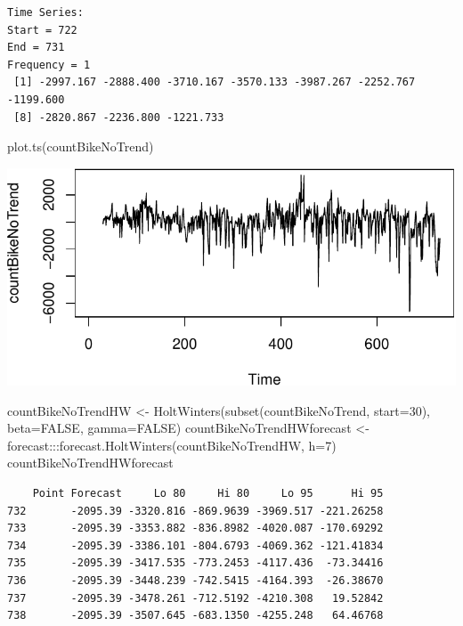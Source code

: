 \documentclass[
  letterpaper,
  DIV=11,
  numbers=noendperiod]{scrreprt}
\newenvironment{Shaded}{\begin{snugshade}}{\end{snugshade}}
\newcommand{\AttributeTok}[1]{\textcolor[rgb]{0.40,0.45,0.13}{#1}}
\newcommand{\ConstantTok}[1]{\textcolor[rgb]{0.56,0.35,0.01}{#1}}
\newcommand{\DecValTok}[1]{\textcolor[rgb]{0.68,0.00,0.00}{#1}}
\newcommand{\FunctionTok}[1]{\textcolor[rgb]{0.28,0.35,0.67}{#1}}
\newcommand{\NormalTok}[1]{\textcolor[rgb]{0.00,0.23,0.31}{#1}}
\newcommand{\OtherTok}[1]{\textcolor[rgb]{0.00,0.23,0.31}{#1}}
\newcommand{\SpecialCharTok}[1]{\textcolor[rgb]{0.37,0.37,0.37}{#1}}
\begin{document}
\begin{verbatim}
Time Series:
Start = 722 
End = 731 
Frequency = 1 
 [1] -2997.167 -2888.400 -3710.167 -3570.133 -3987.267 -2252.767 -1199.600
 [8] -2820.867 -2236.800 -1221.733
\end{verbatim}

\begin{Shaded}
\begin{Highlighting}[]
\FunctionTok{plot.ts}\NormalTok{(countBikeNoTrend)}
\end{Highlighting}
\end{Shaded}

\includegraphics{prednaska2_HoltWinters_files/figure-pdf/unnamed-chunk-10-1.pdf}

\begin{Shaded}
\begin{Highlighting}[]
\NormalTok{countBikeNoTrendHW }\OtherTok{\textless{}{-}} \FunctionTok{HoltWinters}\NormalTok{(}\FunctionTok{subset}\NormalTok{(countBikeNoTrend, }\AttributeTok{start=}\DecValTok{30}\NormalTok{), }\AttributeTok{beta=}\ConstantTok{FALSE}\NormalTok{, }\AttributeTok{gamma=}\ConstantTok{FALSE}\NormalTok{)}
\NormalTok{countBikeNoTrendHWforecast }\OtherTok{\textless{}{-}}\NormalTok{ forecast}\SpecialCharTok{:::}\FunctionTok{forecast.HoltWinters}\NormalTok{(countBikeNoTrendHW, }\AttributeTok{h=}\DecValTok{7}\NormalTok{)}
\NormalTok{countBikeNoTrendHWforecast}
\end{Highlighting}
\end{Shaded}

\begin{verbatim}
    Point Forecast     Lo 80     Hi 80     Lo 95      Hi 95
732       -2095.39 -3320.816 -869.9639 -3969.517 -221.26258
733       -2095.39 -3353.882 -836.8982 -4020.087 -170.69292
734       -2095.39 -3386.101 -804.6793 -4069.362 -121.41834
735       -2095.39 -3417.535 -773.2453 -4117.436  -73.34416
736       -2095.39 -3448.239 -742.5415 -4164.393  -26.38670
737       -2095.39 -3478.261 -712.5192 -4210.308   19.52842
738       -2095.39 -3507.645 -683.1350 -4255.248   64.46768
\end{verbatim}
\end{document}
